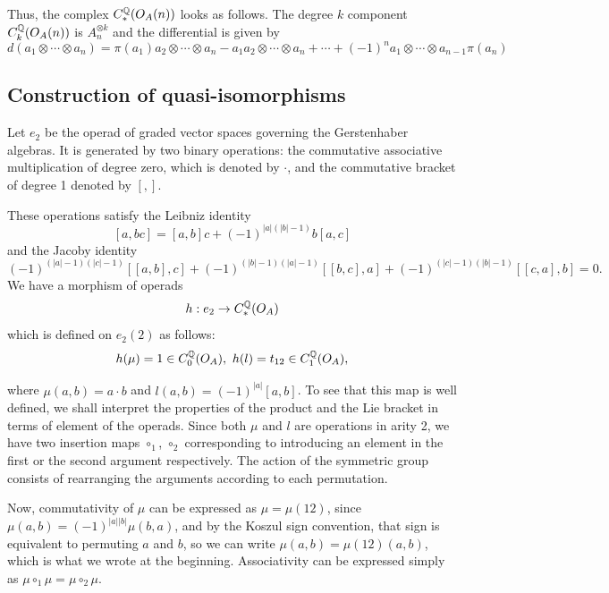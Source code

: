 \documentclass[TFM.tex]{subfiles}
\begin{document}
Thus, the complex $C_*^{\mathbb{Q}}(O_A(n))$ looks as follows. The degree $k$ component $C_k^{\mathbb{Q}}(O_A(n))$ is $A_n^{\otimes k}$ and the differential is given by %
\[
d(a_1\otimes\cdots\otimes a_n)=\pi(a_1)a_2\otimes\cdots\otimes a_n-a_1a_2\otimes \cdots\otimes a_n+\cdots+(-1)^{n}a_1\otimes\cdots\otimes a_{n-1}\pi(a_n)
\]
\subsection{Construction of quasi-isomorphisms}
Let $e_2$ be the operad of graded vector spaces governing the Gerstenhaber algebras.
It is generated by two binary operations: the commutative associative multiplication of degree zero, which is denoted by $\cdot$, and the commutative bracket of degree 1 denoted by $[,]$. 

These operations satisfy the Leibniz identity
\[
[a, bc]= [a, b]c+(-1)^{|a|(|b|-1)}b[a,c]
\]
and the Jacoby identity
\[
(-1)^{(|a|-1)(|c|-1)}[[a,b],c]+(-1)^{(|b|-1)(|a|-1)}[[b,c],a]+(-1)^{(|c|-1)(|b|-1)}[[c,a],b]=0.
\]
We have a morphism of operads
\[
h:e_2\to C_*^{\mathbb{Q}}(O_A)
\]
which is defined on $e_2(2)$ as follows:
\[
h(\mu)=1\in C_0^\Q(O_A),\ h(l)=t_{12}\in C_1^\Q(O_A),
\]

where $\mu(a,b)=a\cdot b$ and $l(a,b)=(-1)^{|a|}[a,b]$. To see that this map is well defined, we shall interpret the properties of the product and the Lie bracket in terms of element of the operads. Since both $\mu$ and $l$ are operations in arity 2, we have two insertion maps $\circ_1$, $\circ_2$ corresponding to introducing an element in the first or the second argument respectively. The action of the symmetric group consists of rearranging the arguments according to each permutation.

Now, commutativity of $\mu$ can be expressed as $\mu=\mu(12)$, since $\mu(a,b)=(-1)^{|a||b|}\mu(b,a)$, and by the Koszul sign convention, that sign is equivalent to permuting $a$ and $b$, so we can write $\mu(a,b)=\mu(12)(a,b)$, which is what we wrote at the beginning.  Associativity can be expressed simply as $\mu\circ_1\mu=\mu\circ_2\mu$.
\end{document}
